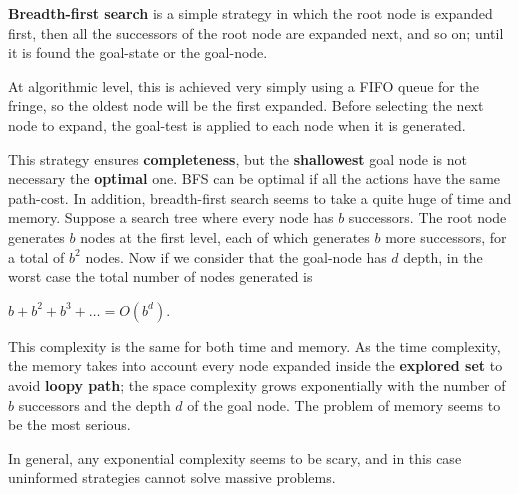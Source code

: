 \textbf{Breadth-first search} is a simple strategy in which the root node is expanded first, then all the successors of the root node are expanded next, and so on; until it is
found the goal-state or the goal-node. \vspace{3.5pt}

At algorithmic level, this is achieved very simply using a FIFO queue for the fringe, so the oldest node will be the first expanded. Before selecting the next node to 
expand, the goal-test is applied to each node when it is generated.

This strategy ensures \textbf{completeness}, but the \textbf{shallowest} goal node is not necessary the \textbf{optimal} one. BFS can be optimal if all the actions have the same 
path-cost. In addition, breadth-first search seems to take a quite huge of time and memory. Suppose a search tree where every node has $b$ successors. The root node generates
$b$ nodes at the first level, each of which generates $b$ more successors, for a total of $b^2$ nodes. Now if we consider that the goal-node has $d$ depth, in the worst case 
the total number of nodes generated is \vspace{3.5pt}
\begin{center}
    $b + b^2 + b^3 + \dots = O(b^d)$.
\end{center} \vspace{3.5pt}
This complexity is the same for both time and memory. As the time complexity, the memory takes into account every node expanded inside the \textbf{explored set} to avoid
\textbf{loopy path}; the space complexity grows exponentially with the number of $b$ successors and the depth $d$ of the goal node. The problem of memory seems to be the most serious. \vspace{3.5pt}

In general, any exponential complexity seems to be scary, and in this case uninformed strategies cannot solve massive problems.